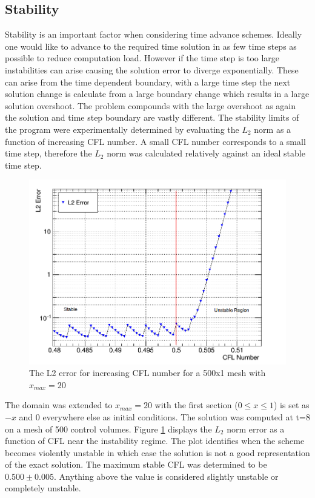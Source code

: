 \documentclass[paper=a4, fontsize=11pt, abstract=on]{scrartcl}
\numberwithin{equation}{section}		%
\numberwithin{figure}{section}			%
\numberwithin{table}{section}				%
\begin{document}
\subsection{Stability}
Stability is an important factor when considering time advance schemes. Ideally one would like to advance to the required time solution in as few time steps as possible to reduce computation load. However if the time step is too large instabilities can arise causing the solution error to diverge exponentially. These can arise from the time dependent boundary, with a large time step the next solution change is calculate from a large boundary change which results in a large solution overshoot. The problem  compounds with the large overshoot as again the solution and time step boundary are vastly different. The stability limits of the program were experimentally determined by evaluating the $L_2$ norm as a function of increasing CFL number. A small CFL number corresponds to a small time step, therefore the $L_2$ norm was calculated relatively against an ideal stable time step. 



\begin{figure}[H]
\centering
\includegraphics[width=0.85\linewidth]{stabl2}
\caption{The L2 error for increasing CFL number for a 500x1 mesh with $x_{max} = 20$}
\label{stbl1}
\end{figure}

The domain was extended to $x_{max} =20$ with the first section ($0\leq x \leq 1 $) is set as $-x$ and 0 everywhere else as initial conditions. The solution was computed at t=8 on a mesh of 500 control volumes. Figure \ref{stbl1} displays the $L_2$ norm error as a function of CFL near the instability regime. The plot identifies when the scheme becomes violently unstable in which case the solution is not a good representation of the exact solution. The maximum stable CFL was determined to be $0.500 \pm 0.005$. Anything above the value is considered slightly unstable or completely unstable.   
\end{document}

